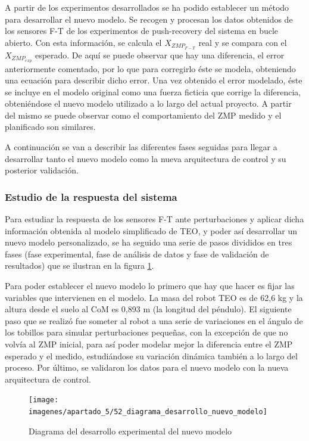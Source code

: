A partir de los experimentos desarrollados se ha podido establecer un método para desarrollar el nuevo modelo. Se recogen y procesan los datos obtenidos de los sensores F-T de los experimentos de push-recovery del sistema en bucle abierto. Con esta información, se calcula el $X_{ZMP_{F-T}}$ real y se compara con el $X_{ZMP_{exp}}$ esperado. De aquí se puede observar que hay una diferencia, el error anteriormente comentado, por lo que para corregirlo éste se modela, obteniendo una ecuación para describir dicho error. Una vez obtenido el error modelado, éste se incluye en el modelo original como una fuerza ficticia que corrige la diferencia, obteniéndose el nuevo modelo utilizado a lo largo del actual proyecto. A partir del mismo se puede observar como el comportamiento del ZMP medido y el planificado son similares.

A continuación se van a describir las diferentes fases seguidas para llegar a desarrollar tanto el nuevo modelo como la nueva arquitectura de control y su posterior validación.

\subsubsection{Estudio de la respuesta del sistema}

Para estudiar la respuesta de los sensores F-T ante perturbaciones y aplicar dicha información obtenida al modelo simplificado de TEO, y poder así desarrollar un nuevo modelo personalizado, se ha seguido una serie de pasos divididos en tres fases (fase experimental, fase de análisis de datos y fase de validación de resultados) que se ilustran en la figura \ref{figura52}. 

Para poder establecer el nuevo modelo lo primero que hay que hacer es fijar las variables que intervienen en el modelo. La masa del robot TEO es de 62,6 kg y la altura desde el suelo al CoM es 0,893 m (la longitud del péndulo). El siguiente paso que se realizó fue someter al robot a una serie de variaciones en el ángulo de los tobillos para simular perturbaciones pequeñas, con la excepción de que no volvía al ZMP inicial, para así poder modelar mejor la diferencia entre el ZMP esperado y el medido, estudiándose su variación dinámica también a lo largo del proceso. Por último, se validaron los datos para el nuevo modelo con la nueva arquitectura de control.

\begin{figure}[H]
\centering
\texttt{[image: imagenes/apartado\_5/52\_diagrama\_desarrollo\_nuevo\_modelo]}
\caption{Diagrama del desarrollo experimental del nuevo modelo}
\label{figura52}
\end{figure}

